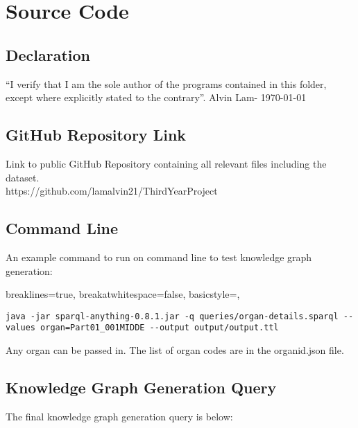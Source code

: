 \chapter{Source Code}
\section{Declaration}
``I verify that I am the sole author of the programs contained in this folder, except where explicitly stated to the contrary''. Alvin Lam- \today

\section{GitHub Repository Link}
Link to public GitHub Repository containing all relevant files including the dataset. \\
https://github.com/lamalvin21/ThirdYearProject

\section{Command Line}
An example command to run on command line to test knowledge graph generation:

\lstset
{
    breaklines=true,
    breakatwhitespace=false,
    basicstyle=\linespread{1}\ttfamily,
}
\begin{lstlisting}
java -jar sparql-anything-0.8.1.jar -q queries/organ-details.sparql --values organ=Part01_001MIDDE --output output/output.ttl
\end{lstlisting}

Any organ can be passed in. The list of organ codes are in the organid.json file.

\section{Knowledge Graph Generation Query}
The final knowledge graph generation query is below:

